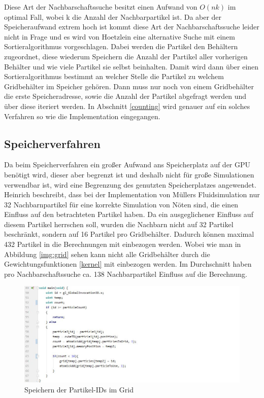 \documentclass[intern,palatino]{cgBA}
\begin{document}
Diese Art der Nachbarschaftssuche besitzt einen Aufwand von $O(n k)$ im optimal Fall, wobei k die Anzahl der Nachbarpartikel ist. Da aber der Speicheraufwand extrem hoch ist kommt diese Art der Nachbarschaftssuche leider nicht in Frage und es wird von Hoetzlein \cite{nvidia} eine alternative Suche mit einem Sortieralgorithmus vorgeschlagen.
\newline
Dabei werden die Partikel den Behältern zugeordnet, diese wiederum Speichern die Anzahl der Partikel aller vorherigen Behälter und wie viele Partikel sie selbst beinhalten. Damit wird dann über einen Sortieralgorithmus bestimmt an welcher Stelle die Partikel zu welchem Gridbehälter im Speicher gehören. Dann muss nur noch von einem Gridbehälter die erste Speicheradresse, sowie die Anzahl der Partikel abgefragt werden und über diese iteriert werden.
\newline
In Abschnitt \ref{counting} wird genauer auf ein solches Verfahren so wie die Implementation eingegangen.


\subsection{Speicherverfahren}\label{speicher}

Da beim Speicherverfahren ein großer Aufwand ans Speicherplatz auf der GPU benötigt wird, dieser aber begrenzt ist und deshalb nicht für große Simulationen verwendbar ist, wird eine Begrenzung des genutzten Speicherplatzes angewendet. Heinrich \cite{nvidia2} beschreibt, dass bei der Implementation von Müllers \cite{muller2003particle} Fluidsimulation nur 32 Nachbarnpartikel für eine korrekte Simulation von Nöten sind, die einen Einfluss auf den betrachteten Partikel haben. Da ein ausgeglichener Einfluss auf diesem Partikel herrschen soll, wurden die Nachbarn nicht auf 32 Partikel beschränkt, sondern auf 16 Partikel pro Gridbehälter. Dadurch können maximal 432 Partikel in die Berechnungen mit einbezogen werden. Wobei wie man in Abbildung \ref{img:grid} sehen kann nicht alle Gridbehälter durch die Gewichtungsfunktionen \ref{kernel} mit einbezogen werden. Im Durchschnitt haben pro Nachbarschaftssuche ca. 138 Nachbarpartikel Einfluss auf die Berechnung.
\newline
\begin{figure}[H]
	\centering
	\includegraphics[width=1.3\columnwidth]{Bilder/StoringLable.jpg}
	\caption{Speichern der Partikel-IDs im Grid }
	\label{img:Storinglable}
\end{figure}
\end{document}

